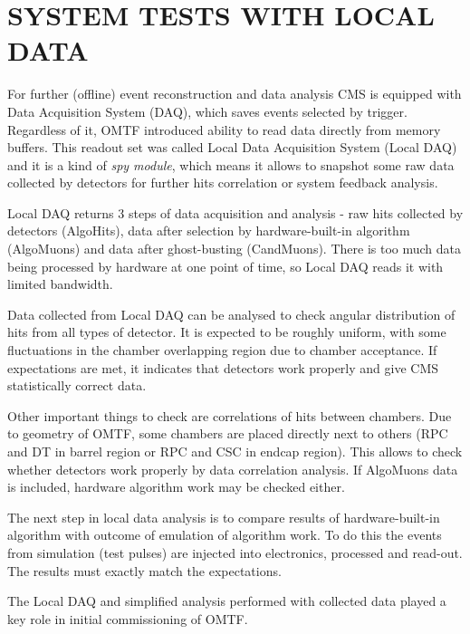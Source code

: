 \section{SYSTEM TESTS WITH LOCAL DATA}

For further (offline) event reconstruction and data analysis CMS is 
equipped with Data Acquisition
System (DAQ), which saves events selected by trigger. Regardless of
it, OMTF introduced ability to read data directly from memory buffers.
This readout set was called Local Data Acquisition System (Local DAQ)
and it is a kind of \textit{spy module}, which means it allows to snapshot
some raw data collected by detectors for further hits correlation
or system feedback analysis.

Local DAQ returns 3 steps of data acquisition and analysis - raw hits
collected by detectors (AlgoHits), data after selection by hardware-built-in
algorithm (AlgoMuons) and data after ghost-busting (CandMuons). There
is too much data being processed by hardware at one point of time,
so Local DAQ reads it with limited bandwidth.

Data collected from Local DAQ can be analysed to check angular distribution
of hits from all types of detector. It is expected to be roughly uniform, with some
fluctuations in the chamber overlapping region due to chamber acceptance. 
If expectations are
met, it indicates that detectors work properly and give CMS statistically
correct data.

Other important things to check are correlations of hits between chambers.
Due to geometry of OMTF, some chambers are placed directly next to
others (RPC and DT in barrel region or RPC and CSC in endcap region).
This allows to check whether detectors work properly by data correlation
analysis. If AlgoMuons data is included, hardware algorithm work may
be checked either.

The next step in local data analysis is to compare results of hardware-built-in
algorithm with outcome of emulation of algorithm work. To do this the events
from simulation (test pulses) are injected into electronics, processed and
read-out. The results must exactly match the expectations.

The Local DAQ and simplified analysis performed with collected data played 
a key role in initial commissioning of OMTF.
